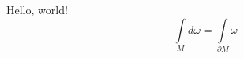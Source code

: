 \documentclass[a4paper, 12pt]{article}
\begin{document}
    Hello, world!
    \[
        \int\limits_{M} d\omega = \int\limits_{\partial M} \omega
    \]
\end{document}
